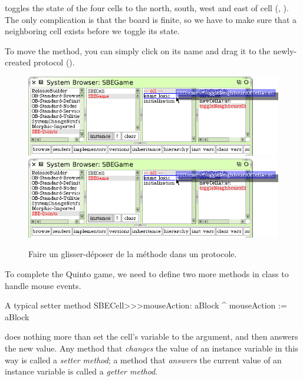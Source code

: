 \documentclass[a4paper,10pt,twoside]{book}
\begin{document}
 toggles the state of the four cells to the north, south, west and east of cell (, ).  The only complication is that the board is finite, so we have to make sure that a neighboring cell exists before we toggle its state.

To move the method, you can simply click on its name and drag it to the newly-created protocol ().

\begin{figure}[htbp]
   \centering
   \ifluluelse
		{\includegraphics[width=\textwidth]{DragMethod} }
		{\includegraphics[scale=0.7]{DragMethod} }
   \caption{Faire un glisser-déposer de la méthode dans un protocole.\label{fig:dragMethod}}
\end{figure}

To complete the Quinto game, we need to define two more methods in class  to handle mouse events.
\begin{method}[mouseAction:]{A typical setter method}
SBECell>>>mouseAction: aBlock
   ^ mouseAction := aBlock
\end{method}

 does nothing more than set the cell's  variable to the argument, and then answers the new value.
Any method that \emph{changes} the value of an instance variable in this way is called a \emph{setter method}; a method that \emph{answers} the current value of an instance variable is called a \emph{getter method}.
\end{document}
